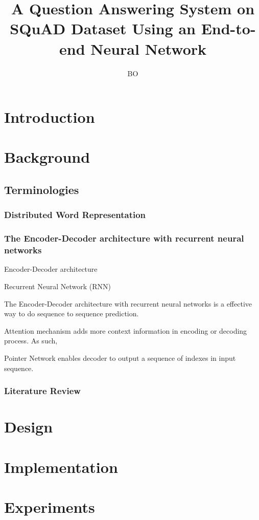 \documentclass[modernstyle,12pt]{sjsuthesis}
\title{A Question Answering System on SQuAD Dataset Using an End-to-end Neural Network}
\author{BO}{LI}
\theoremstyle{definition}
\begin{document}
\raggedright          %
\parindent=30pt       %




\chapter{Introduction}
\chapter{Background}
\section{Terminologies}

\subsection{Distributed Word Representation}

\subsection{The Encoder-Decoder architecture with recurrent neural networks}

Encoder-Decoder architecture

Recurrent Neural Network (RNN)

The Encoder-Decoder architecture with recurrent neural networks is a effective way to do sequence to sequence prediction.

Attention mechanism adds more context information in encoding or decoding process. As such,


Pointer Network enables decoder to output a sequence of indexes in input sequence.

\subsection{Literature Review}
\chapter{Design}
\chapter{Implementation}
\chapter{Experiments}
\end{document}
